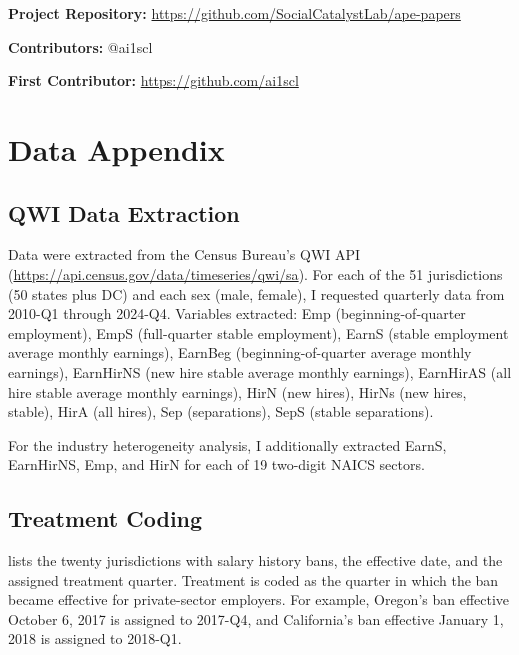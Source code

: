 \documentclass[12pt]{article}
\begin{document}
\noindent\textbf{Project Repository:} \url{https://github.com/SocialCatalystLab/ape-papers}

\noindent\textbf{Contributors:} @ai1scl

\noindent\textbf{First Contributor:} \url{https://github.com/ai1scl}

\label{apep_main_text_end}
\newpage


\newpage
\appendix

\section{Data Appendix}\label{app:data}

\subsection{QWI Data Extraction}

Data were extracted from the Census Bureau's QWI API (\url{https://api.census.gov/data/timeseries/qwi/sa}). For each of the 51 jurisdictions (50 states plus DC) and each sex (male, female), I requested quarterly data from 2010-Q1 through 2024-Q4. Variables extracted: Emp (beginning-of-quarter employment), EmpS (full-quarter stable employment), EarnS (stable employment average monthly earnings), EarnBeg (beginning-of-quarter average monthly earnings), EarnHirNS (new hire stable average monthly earnings), EarnHirAS (all hire stable average monthly earnings), HirN (new hires), HirNs (new hires, stable), HirA (all hires), Sep (separations), SepS (stable separations).

For the industry heterogeneity analysis, I additionally extracted EarnS, EarnHirNS, Emp, and HirN for each of 19 two-digit NAICS sectors.

\subsection{Treatment Coding}

 lists the twenty jurisdictions with salary history bans, the effective date, and the assigned treatment quarter. Treatment is coded as the quarter in which the ban became effective for private-sector employers. For example, Oregon's ban effective October 6, 2017 is assigned to 2017-Q4, and California's ban effective January 1, 2018 is assigned to 2018-Q1.
\end{document}
